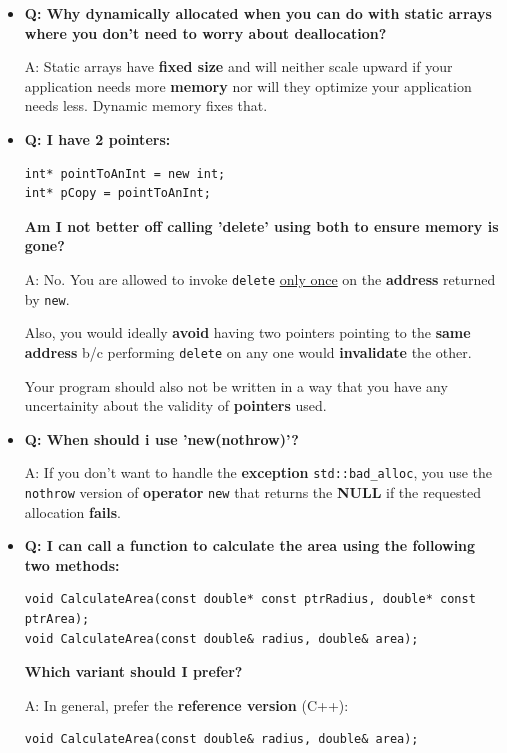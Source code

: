 \documentclass[10pt]{article}
\begin{document}
\begin{itemize}
\item \textbf{Q: Why dynamically allocated when you can do with static arrays where you don't need to worry about deallocation?}

	A: Static arrays have \textbf{fixed size} and will neither scale upward if your application needs more \textbf{memory} nor will they optimize your application needs less. Dynamic memory fixes that. \\ 

\item \textbf{Q: I have 2 pointers:}
	\begin{verbatim}
int* pointToAnInt = new int;
int* pCopy = pointToAnInt;
	\end{verbatim}
	\textbf{Am I not better off calling 'delete' using both to ensure memory is gone?}

	A: No. You are allowed to invoke \verb|delete| \underline{only once} on the \textbf{address} returned by \verb|new|.

	Also, you would ideally \textbf{avoid} having two pointers pointing to the \textbf{same address} b/c performing \verb|delete| on any one would \textbf{invalidate} the other. 

	Your program should also not be written in a way that you have any uncertainity about the validity of \textbf{pointers} used.\\

\item \textbf{Q: When should i use 'new(nothrow)'?}

	A: If you don't want to handle the \textbf{exception} \verb|std::bad_alloc|, you use the \verb|nothrow| version of \textbf{operator} \verb|new| that returns the \textbf{NULL} if the requested allocation \textbf{fails}.\\ 

\item \textbf{Q: I can call a function to calculate the area using the following two methods:}

\begin{verbatim}
void CalculateArea(const double* const ptrRadius, double* const ptrArea);
void CalculateArea(const double& radius, double& area);
\end{verbatim}

\textbf{Which variant should I prefer?}

A: In general, prefer the \textbf{reference version} (C++):

\begin{verbatim}
void CalculateArea(const double& radius, double& area);
\end{verbatim}


\end{itemize}
\end{document}
